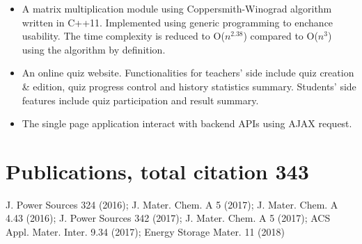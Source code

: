 \documentclass{resume}
\begin{document}
\begin{itemize}
  \item A matrix multiplication module using Coppersmith-Winograd algorithm written in C++11. Implemented using generic programming to enchance usability. The time complexity is reduced to O($n^{2.38}$) compared to O($n^3$) using the algorithm by definition.
\end{itemize}

\begin{itemize}
  \item An online quiz website. Functionalities for teachers' side include quiz creation \& edition, quiz progress control and history statistics summary. Students' side features include quiz participation and result summary. 
  \item The single page application interact with backend APIs using AJAX request. 
\end{itemize}


\section{Publications, total citation 343}
  J. Power Sources 324 (2016); J. Mater. Chem. A 5 (2017); J. Mater. Chem. A 4.43
  (2016); J. Power Sources 342 (2017); J. Mater. Chem. A 5 (2017); ACS
  Appl. Mater. Inter. 9.34 (2017); Energy Storage Mater. 11 (2018)
\end{document}
